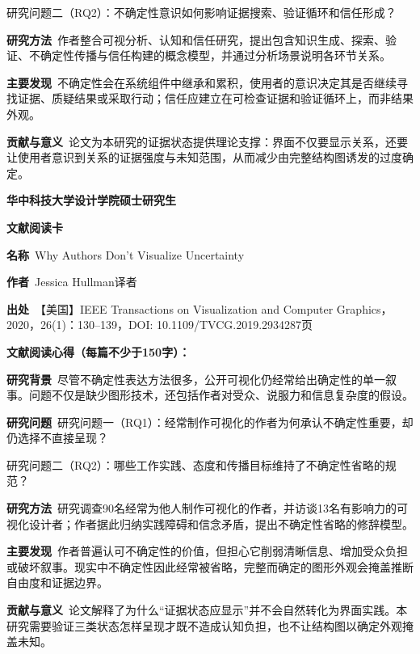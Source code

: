 研究问题二（RQ2）：不确定性意识如何影响证据搜索、验证循环和信任形成？\par
\noindent\textbf{研究方法}\ 作者整合可视分析、认知和信任研究，提出包含知识生成、探索、验证、不确定性传播与信任构建的概念模型，并通过分析场景说明各环节关系。\par
\noindent\textbf{主要发现}\ 不确定性会在系统组件中继承和累积，使用者的意识决定其是否继续寻找证据、质疑结果或采取行动；信任应建立在可检查证据和验证循环上，而非结果外观。\par
\noindent\textbf{贡献与意义}\ 论文为本研究的证据状态提供理论支撑：界面不仅要显示关系，还要让使用者意识到关系的证据强度与未知范围，从而减少由完整结构图诱发的过度确定。\par
\clearpage
\begin{center}
{\songti\bfseries\fontsize{18.5pt}{27.75pt}\selectfont 华中科技大学设计学院硕士研究生\par}
{\songti\bfseries\fontsize{18.5pt}{27.75pt}\selectfont 文献阅读卡\par}
\end{center}
\vspace{0.25em}
\noindent\underline{}\par
\vspace{0.35em}
\noindent\textbf{名称}\ Why Authors Don't Visualize Uncertainty\par
\noindent\textbf{作者}\ Jessica Hullman\quad 译者\par
\noindent\textbf{出处}\ 【美国】IEEE Transactions on Visualization and Computer Graphics，2020，26(1)：130–139，DOI: 10.1109/TVCG.2019.2934287\quad 页\par
\vspace{0.35em}
\noindent\textbf{文献阅读心得（每篇不少于150字）：}\par
\noindent\textbf{研究背景}\ 尽管不确定性表达方法很多，公开可视化仍经常给出确定性的单一叙事。问题不仅是缺少图形技术，还包括作者对受众、说服力和信息复杂度的假设。\par
\noindent\textbf{研究问题}\ 研究问题一（RQ1）：经常制作可视化的作者为何承认不确定性重要，却仍选择不直接呈现？\par
研究问题二（RQ2）：哪些工作实践、态度和传播目标维持了不确定性省略的规范？\par
\noindent\textbf{研究方法}\ 研究调查90名经常为他人制作可视化的作者，并访谈13名有影响力的可视化设计者；作者据此归纳实践障碍和信念矛盾，提出不确定性省略的修辞模型。\par
\noindent\textbf{主要发现}\ 作者普遍认可不确定性的价值，但担心它削弱清晰信息、增加受众负担或破坏叙事。现实中不确定性因此经常被省略，完整而确定的图形外观会掩盖推断自由度和证据边界。\par
\noindent\textbf{贡献与意义}\ 论文解释了为什么“证据状态应显示”并不会自然转化为界面实践。本研究需要验证三类状态怎样呈现才既不造成认知负担，也不让结构图以确定外观掩盖未知。\par
\restoregeometry
\setlength{\parindent}{2em}
